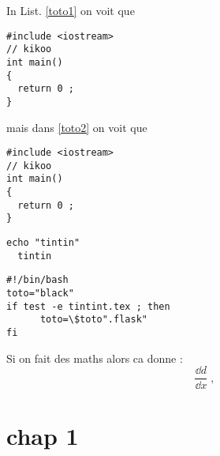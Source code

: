 \documentclass{report}
\begin{document}

In List. \ref{toto1} on voit que 

\begin{lstlisting}[style=CPP,caption=Un exemple C++,label=toto1]
#include <iostream>
// kikoo
int main()
{
  return 0 ;
}
\end{lstlisting}

mais dans \ref{toto2} on voit que

\begin{lstlisting}[style=C,caption=Un exemple C,label=toto2]
#include <iostream>
// kikoo
int main()
{
  return 0 ;
}
\end{lstlisting}

\begin{lstlisting}[style=bash]
  echo "tintin"
  tintin
\end{lstlisting}

\begin{lstlisting}[style=bash]
#!/bin/bash
toto="black"
if test -e tintint.tex ; then
      toto=\$toto".flask"
fi
\end{lstlisting}




Si on fait des maths alors ca donne : 
\[
\frac{\dd d}{\dd x} \;,
\]


\chapter{chap 1}
\end{document}
